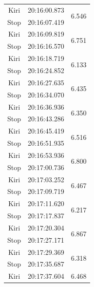 \begin{longtable}{|c|c|c|}
  Kiri           & 20:16:00.873        & \multirow{2}{*}{6.546}  \\ \cline{1-2}
  Stop           & 20:16:07.419        &                         \\ \hline
  Kiri           & 20:16:09.819        & \multirow{2}{*}{6.751}  \\ \cline{1-2}
  Stop           & 20:16:16.570        &                         \\ \hline
  Kiri           & 20:16:18.719        & \multirow{2}{*}{6.133}  \\ \cline{1-2}
  Stop           & 20:16:24.852        &                         \\ \hline
  Kiri           & 20:16:27.635        & \multirow{2}{*}{6.435}  \\ \cline{1-2}
  Stop           & 20:16:34.070        &                         \\ \hline
  Kiri           & 20:16:36.936        & \multirow{2}{*}{6.350}  \\ \cline{1-2}
  Stop           & 20:16:43.286        &                         \\ \hline
  Kiri           & 20:16:45.419        & \multirow{2}{*}{6.516}  \\ \cline{1-2}
  Stop           & 20:16:51.935        &                         \\ \hline
  Kiri           & 20:16:53.936        & \multirow{2}{*}{6.800}  \\ \cline{1-2}
  Stop           & 20:17:00.736        &                         \\ \hline
  Kiri           & 20:17:03.252        & \multirow{2}{*}{6.467}  \\ \cline{1-2}
  Stop           & 20:17:09.719        &                         \\ \hline
  Kiri           & 20:17:11.620        & \multirow{2}{*}{6.217}  \\ \cline{1-2}
  Stop           & 20:17:17.837        &                         \\ \hline
  Kiri           & 20:17:20.304        & \multirow{2}{*}{6.867}  \\ \cline{1-2}
  Stop           & 20:17:27.171        &                         \\ \hline
  Kiri           & 20:17:29.369        & \multirow{2}{*}{6.318}  \\ \cline{1-2}
  Stop           & 20:17:35.687        &                         \\ \hline
  Kiri           & 20:17:37.604        & \multirow{2}{*}{6.468}  \\ \cline{1-2}

\end{longtable}
